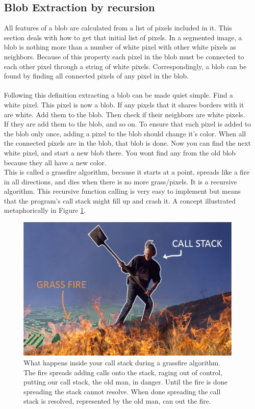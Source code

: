 \subsection{Blob Extraction by recursion}
All features of a blob are calculated from a list of pixels included in it. This section deals with how to get that initial list of pixels. In a segmented image, a blob is nothing more than a number of white pixel with other white pixels as neighbors. Because of this property each pixel in the blob must be connected to each other pixel through a string of white pixels. Correspondingly, a blob can be found by finding all connected pixels of any pixel in the blob.\\\\
Following this definition extracting a blob can be made quiet simple. Find a white pixel. This pixel is now a blob.  If any pixels that it shares borders with it are white. Add them to the blob. Then check if their neighbors are white pixels. If they are add them to the blob, and so on. To ensure that each pixel is added to the blob only once, adding a pixel to the blob should change it's color. When all the connected pixels are in the blob, that blob is done. Now you can find the next white pixel, and start a new blob there. You wont find any from the old blob because they all have a new color.\\
This is called a grassfire algorithm, because it starts at a point, spreads like a fire in all directions, and dies when there is no more grass/pixels.
It is a recursive algorithm. This recursive function calling is very easy to implement but means that the program's call stack might fill up and crash it. A concept illustrated metaphorically in Figure \ref{fig:firefighter}.  
\begin{figure}[H]
	\centering
	\includegraphics[width=0.6\linewidth]{figure/Analysis/firefighter.jpg}
	\caption{What happens inside your call stack during a grassfire algorithm. The fire spreads adding calls onto the stack, raging out of control, putting our call stack, the old man, in danger. Until the fire is done spreading the stack cannot resolve. When done spreading the call stack is resolved, represented by the old man, can out the fire.}
	\label{fig:firefighter}
\end{figure} 
